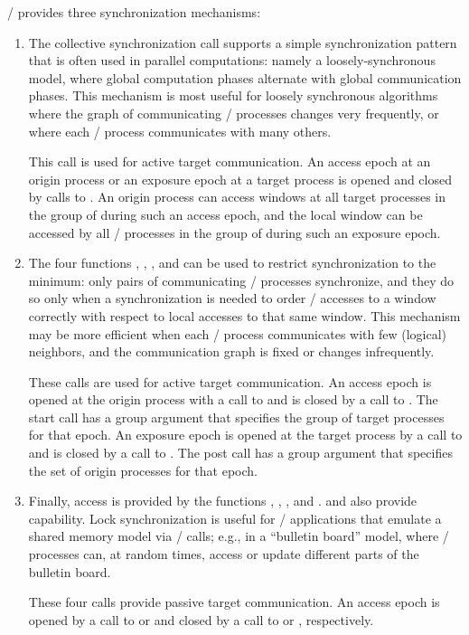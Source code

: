 \MPI/ provides three synchronization mechanisms:
\begin{enumerate}
\item
The
 collective synchronization call supports a
simple synchronization pattern that is often used in parallel
computations: namely a loosely-synchronous model, where global
computation phases alternate with global communication phases.
This mechanism is most useful for loosely synchronous algorithms where
the graph of communicating \mpi/ processes changes very frequently, or where
each \mpi/ process communicates with many 
others.

This call is used for active target communication.  An access epoch at an
origin process or an exposure epoch at a target process is opened
and closed by calls to .  An origin process can
access windows at all target processes in the group of  during
such an access
epoch, and the local window can be accessed by all \mpi/ processes in the
group of  during such an exposure epoch.
\item
The four functions , 
,
, and
can be used to restrict synchronization to the minimum: only
pairs of communicating \mpi/ processes synchronize, and they do so only when
a synchronization is needed to order \RMA/ accesses to a
window correctly with respect to local accesses to that same window.
This mechanism may be 
more efficient when each \mpi/ process communicates with few (logical)
neighbors, and the communication graph is fixed or changes
infrequently.

These calls are used for 
active target communication.  An access epoch is opened
at the origin process
with a call to  and is closed by a call to
.  The start call has a group argument
that specifies the group of target processes for that
epoch. An exposure epoch is opened at the
target process by a call
to  and is closed by a call to
.  The post call has a group argument that
specifies the set of origin processes for that 
epoch.
\item
Finally, 
access is provided by the functions ,
, , and
.   and
 also provide  capability.
Lock synchronization
is useful for \MPI/ applications that
emulate a shared memory model via \MPI/ calls; e.g., in a ``bulletin board''
model, where \mpi/ processes can, at random times, access or update
different parts of the bulletin board.

These four calls provide passive target communication.  An access epoch is
opened by a call to  or
 and closed by a call to
 or , respectively.  
\end{enumerate}

